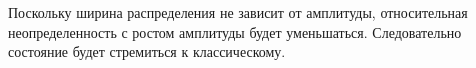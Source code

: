 

Поскольку ширина распределения не зависит от амплитуды, относительная
неопределенность с ростом амплитуды будет уменьшаться. Следовательно
состояние будет стремиться к классическому.







